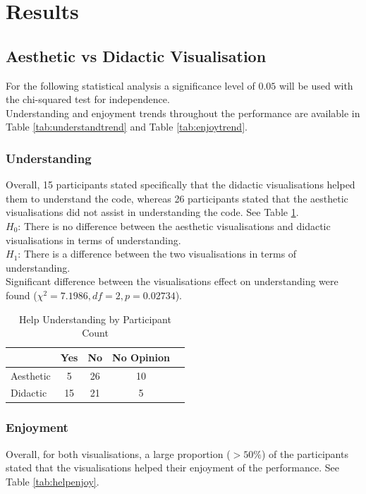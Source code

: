 \documentclass{article}
\begin{document}
\section{Results}

\subsection{Aesthetic vs Didactic Visualisation}

For the following statistical analysis a significance level of $0.05$ will be used with the chi-squared test for independence.\\

Understanding and enjoyment trends throughout the performance are available in Table \ref{tab:understandtrend} and Table \ref{tab:enjoytrend}.

\subsubsection{Understanding}
Overall, 15 participants stated specifically that the didactic visualisations helped them to understand the code, whereas 26 participants stated that the aesthetic visualisations did not assist in understanding the code. See Table \ref{tab:helpunderstand}.\\

$H_0$: There is no difference between the aesthetic visualisations and didactic visualisations in terms of understanding.\\
$H_1$: There is a difference between the two visualisations in terms of understanding.\\

Significant difference between the visualisations effect on understanding were found ($\chi^2=7.1986,df=2,p=0.02734$).


\begin{table}
\caption {Help Understanding by Participant Count} \label{tab:helpunderstand} 
\begin{center}
\begin{tabular}{ l | c c c c }

&Yes&No&No Opinion\\
\hline
Aesthetic&5&26&10 \\
Didactic&15&21&5 \\
\end{tabular}
\end{center}
\end{table}


\subsubsection{Enjoyment}
Overall, for both visualisations, a large proportion ($> 50\%$) of the participants stated that the visualisations helped their enjoyment of the performance. See Table \ref{tab:helpenjoy}.\\
\end{document}
